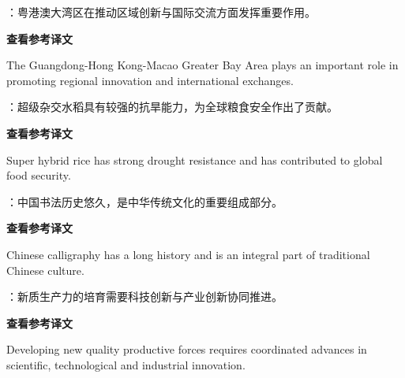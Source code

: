 \documentclass[a4paper,11pt,UTF8,fontset=none]{ctexart}
\begin{document}
\vspace{4pt}

：粤港澳大湾区在推动区域创新与国际交流方面发挥重要作用。\par

\noindent\colorbox{HeadBlue}{\strut {\bfseries 查看参考译文}}\par\vspace{1pt}

\noindent The Guangdong-Hong Kong-Macao Greater Bay Area plays an important role in promoting regional innovation and international exchanges.\par

\vspace{4pt}

：超级杂交水稻具有较强的抗旱能力，为全球粮食安全作出了贡献。\par

\noindent\colorbox{HeadBlue}{\strut {\bfseries 查看参考译文}}\par\vspace{1pt}

\noindent Super hybrid rice has strong drought resistance and has contributed to global food security.\par

\vspace{4pt}

：中国书法历史悠久，是中华传统文化的重要组成部分。\par

\noindent\colorbox{HeadBlue}{\strut {\bfseries 查看参考译文}}\par\vspace{1pt}

\noindent Chinese calligraphy has a long history and is an integral part of traditional Chinese culture.\par

\vspace{4pt}

：新质生产力的培育需要科技创新与产业创新协同推进。\par

\noindent\colorbox{HeadBlue}{\strut {\bfseries 查看参考译文}}\par\vspace{1pt}

\noindent Developing new quality productive forces requires coordinated advances in scientific, technological and industrial innovation.\par
\end{document}
